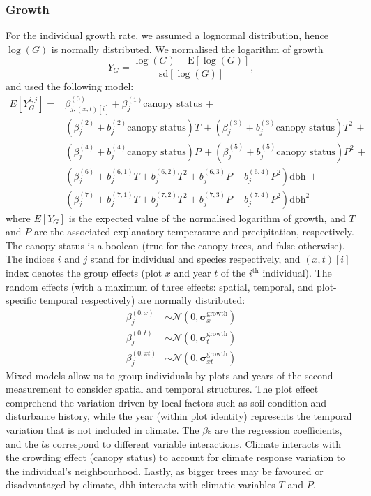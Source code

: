 \subsubsection{Growth}
For the individual growth rate, we assumed a lognormal distribution, hence $ \log(G) $ is normally distributed. We normalised the logarithm of growth
\[
	Y_{G} = \frac{\log(G) - \mathrm{E}[\log(G)]}{\mathrm{sd}[\log(G)]},
\]
and used the following model:
\begin{equation} \label{eq::glmm_growth}
\begin{split}
	E[Y_G^{i, j}] = & \beta_{j, (x, t)[i]}^{(0)} + \beta_j^{(1)}  \text{canopy status} \, + \\
	& \left(\beta_j^{(2)} + b_j^{(2)} \text{canopy status} \right) T \, +
	\left(\beta_j^{(3)} + b_j^{(3)} \text{canopy status} \right) T^2 \, + \\
	& \left(\beta_j^{(4)} + b_j^{(4)} \text{canopy status} \right) P \, +
	\left(\beta_j^{(5)} + b_j^{(5)} \text{canopy status} \right) P^2 \, + \\
	& \left( \beta_j^{(6)} + b_j^{(6, 1)} T + b_j^{(6, 2)} T^2 +
		b_j^{(6, 3)} P + b_j^{(6, 4)} P^2 \right) \text{dbh} \, + \\
	& \left( \beta_j^{(7)} + b_j^{(7, 1)} T + b_j^{(7, 2)} T^2 +
		b_j^{(7, 3)} P + b_j^{(7, 4)} P^2 \right) \text{dbh}^2
\end{split}
\end{equation}
where $ E[Y_G] $ is the expected value of the normalised logarithm of growth, and $ T $ and $ P $ are the associated explanatory temperature and precipitation, respectively. The canopy status is a boolean (true for the canopy trees, and false otherwise). The indices $ i $ and $ j $ stand for individual and species respectively, and $ (x, t)[i] $ index denotes the group effects (plot $ x $ and year $ t $ of the $ i^{\text{th}} $ individual). The random effects (with a maximum of three effects: spatial, temporal, and plot-specific temporal respectively) are normally distributed:
\begin{align*}
	\beta_{j}^{(0, x)} &\sim \mathcal{N}(0, \bm{\sigma}_{x}^{\text{growth}}) \\
	\beta_{j}^{(0, t)} &\sim \mathcal{N}(0, \bm{\sigma}_{t}^{\text{growth}}) \\
	\beta_{j}^{(0, xt)} &\sim \mathcal{N}(0, \bm{\sigma}_{xt}^{\text{growth}})
\end{align*}
Mixed models allow us to group individuals by plots and years of the second measurement to consider spatial and temporal structures. The plot effect comprehend the variation driven by local factors such as soil condition and disturbance history, while the year (within plot identity) represents the temporal variation that is not included in climate. The $ \beta $s are the regression coefficients, and the $ b $s correspond to different variable interactions. Climate interacts with the crowding effect (canopy status) to account for climate response variation to the individual's neighbourhood. Lastly, as bigger trees may be favoured or disadvantaged by climate, dbh interacts with climatic variables $ T $ and $ P $. \\

